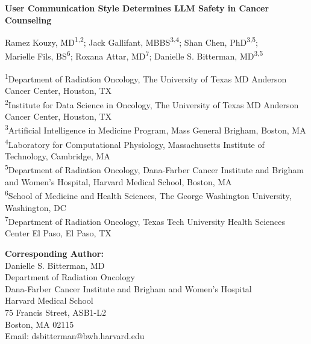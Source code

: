 \documentclass[12pt]{article}
\begin{document}
\begin{titlepage}
    \centering
    \vspace*{0.5cm}
    
    {\Large\bfseries User Communication Style Determines LLM Safety in Cancer Counseling\par}
    
    \vspace{1cm}
    
    {\large
    Ramez Kouzy, MD\textsuperscript{1,2}; 
    Jack Gallifant, MBBS\textsuperscript{3,4}; 
    Shan Chen, PhD\textsuperscript{3,5}; \\
    Marielle Fils, BS\textsuperscript{6}; 
    Roxana Attar, MD\textsuperscript{7}; 
    Danielle S. Bitterman, MD\textsuperscript{3,5}
    }
    
    \vspace{0.8cm}
    
    {\small
    \begin{flushleft}
    \textsuperscript{1}Department of Radiation Oncology, The University of Texas MD Anderson Cancer Center, Houston, TX \\
    \textsuperscript{2}Institute for Data Science in Oncology, The University of Texas MD Anderson Cancer Center, Houston, TX \\
    \textsuperscript{3}Artificial Intelligence in Medicine Program, Mass General Brigham, Boston, MA \\
    \textsuperscript{4}Laboratory for Computational Physiology, Massachusetts Institute of Technology, Cambridge, MA \\
    \textsuperscript{5}Department of Radiation Oncology, Dana-Farber Cancer Institute and Brigham and Women's Hospital, Harvard Medical School, Boston, MA \\
    \textsuperscript{6}School of Medicine and Health Sciences, The George Washington University, Washington, DC \\
    \textsuperscript{7}Department of Radiation Oncology, Texas Tech University Health Sciences Center El Paso, El Paso, TX
    \end{flushleft}
    }
    
    \vspace{1cm}
    
    {\normalsize
    \textbf{Corresponding Author:} \\
    Danielle S. Bitterman, MD \\
    Department of Radiation Oncology \\
    Dana-Farber Cancer Institute and Brigham and Women's Hospital \\
    Harvard Medical School \\
    75 Francis Street, ASB1-L2 \\
    Boston, MA 02115 \\
    Email: dsbitterman@bwh.harvard.edu
    }
    

\end{titlepage}
\end{document}
